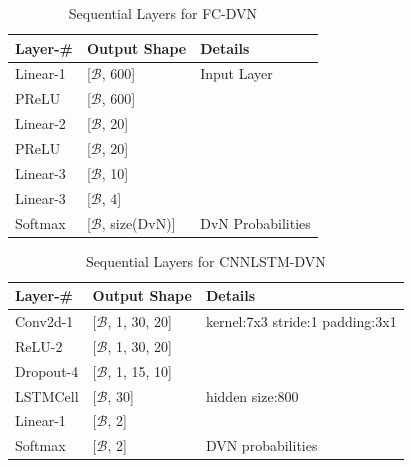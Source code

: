 \documentclass[\main/thesis.tex]{subfiles}
\begin{document}
\begin{center}
    \begin{table}[tbp]
    \centering
    \begin{tabular}{|p{33mm}|p{33mm}|p{50mm}|}
    
    \hline
    Layer-\# & Output Shape &  Details  \\ 
    	\hline
    Linear-1 & [$\mathcal{B}$, 600] &   Input Layer  \\ 
    	\hline
    PReLU & [$\mathcal{B}$, 600] &  \\ 
    	\hline
    Linear-2 & [$\mathcal{B}$, 20] & \\ 
    	\hline
    PReLU & [$\mathcal{B}$, 20] &  \\ 
    	\hline 
    Linear-3 & [$\mathcal{B}$, 10] &  \\ 
    	\hline
    Linear-3 & [$\mathcal{B}$, 4] &  \\ 
    	\hline 
    Softmax & [$\mathcal{B}$, size(DvN)] &  DvN Probabilities\\ 
    	\hline
    \end{tabular}

    \caption{Sequential Layers for FC-DVN}
    \label{table:FCDVN}    
    \end{table}
\end{center}

\begin{center}
\begin{table}[tbp]
\centering
\begin{tabular}{|p{28mm}|p{25mm}|p{50mm}|}
\hline
Layer-\# & Output Shape & Details  \\ \hline
Conv2d-1 & [$\mathcal{B}$, 1, 30, 20]  &
kernel:7x3\newline                  
stride:1\newline    
padding:3x1 \\ \hline
ReLU-2 & [$\mathcal{B}$, 1, 30, 20] & \\  \hline
Dropout-4 & [$\mathcal{B}$, 1, 15, 10] &  \\ \hline
LSTMCell  & [$\mathcal{B}$, 30] & hidden size:800 \\ \hline
Linear-1 & [$\mathcal{B}$, 2] &  \\ \hline 
Softmax & [$\mathcal{B}$, 2] &  DVN probabilities \\ \hline
\end{tabular}

\caption{Sequential Layers for CNNLSTM-DVN }
\label{table:cnndvn}
\end{table}
\end{center}
\end{document}
